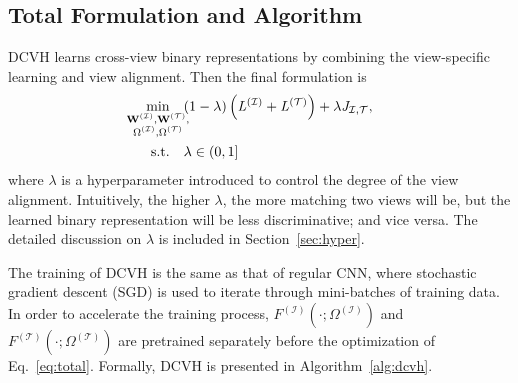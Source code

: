 \documentclass[10pt,twocolumn,letterpaper]{article}
\begin{document}
\subsection{Total Formulation and Algorithm }
DCVH learns cross-view binary representations by combining the view-specific learning and view alignment. Then the final formulation is
\begin{align}\label{eq:total}
\min_{\mathclap{\substack{\mathbf{W}^{(\mathcal{I})},\mathbf{W}^{(\mathcal{T})},\\ \Omega^{(\mathcal{I})},\Omega^{(\mathcal{T})}}}} \quad &(1-\lambda)\left(\mathit{L}^{(\mathcal{I})}+\mathit{L}^{(\mathcal{T})}\right) + \lambda \mathit{J}_{\mathcal{I},\mathcal{T}}, \\
\text{s.t.}\quad &\lambda\in (0,1]\nonumber
\end{align}
where $\lambda$ is a hyperparameter introduced to control the degree of the view alignment. Intuitively, the higher $\lambda$, the more matching two views will be, but the learned binary representation will be less discriminative; and vice versa. The detailed discussion on $\lambda$ is included in Section~\ref{sec:hyper}.

The training of DCVH is the same as that of regular CNN, where stochastic gradient descent (SGD) is used to iterate through mini-batches of training data. In order to accelerate the training process, $F^{(\mathcal{I})}(\cdot;\Omega^{(\mathcal{I})})$ and $F^{(\mathcal{T})}(\cdot;\Omega^{(\mathcal{T})})$ are pretrained separately before the optimization of Eq.~\ref{eq:total}. Formally, DCVH is presented in Algorithm~\ref{alg:dcvh}.
\end{document}
